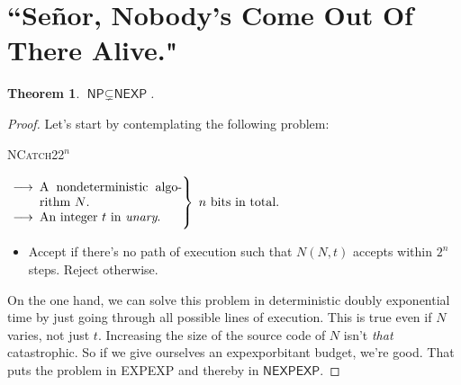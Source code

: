 \documentclass{article}
\newtheorem{theorem}{Theorem}
\newcommand{\NP}{\ensuremath{\textsf{NP}}}
\newcommand{\NEXP}{\ensuremath{\textsf{NEXP}}}
\newcommand{\NEXPEXP}{\ensuremath{\textsf{NEXPEXP}}}
\begin{document}
\section{``Se\~{n}or, Nobody's Come Out Of There Alive."}

\begin{theorem}
$\NP \subsetneq \NEXP$.
\end{theorem}

\begin{proof}
Let's start by contemplating the following problem:
\begin{mdframed}
\textsc{NCatch22}$^n$

\noindent
$
\hspace{-1pt}
\left.\parbox{0.4\textwidth}{
\begin{itemize}[noitemsep,topsep=0.3em]
\item[$\longrightarrow$] A nondeterministic algorithm $N$.
\item[$\longrightarrow$] An integer $t$ in \textit{unary}.
\end{itemize}
}\right\}\;
\text{$n$ bits in total.}\hspace*{\fill}
$
\begin{itemize}[noitemsep,topsep=0.3em]
\item[$\longleftarrow$] Accept if there's no path of execution such that $N(N, t)$ accepts within $2^n$ steps. Reject otherwise.
\end{itemize}
\end{mdframed}
On the one hand, we can solve this problem in deterministic doubly exponential time by just going through all possible lines of execution. This is true even if $N$ varies, not just $t$. Increasing the size of the source code of $N$ isn't \textit{that} catastrophic. So if we give ourselves an expexporbitant budget, we're good. That puts the problem in \textsf{EXPEXP} and thereby in $\NEXPEXP$.


\end{proof}
\end{document}

